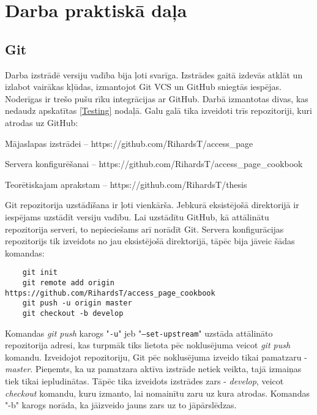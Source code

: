\chapter{Darba praktiskā daļa}

\section{Git}
Darba izstrādē versiju vadība bija ļoti svarīga. Izstrādes gaitā izdevās atklāt un izlabot vairākas kļūdas, izmantojot Git VCS un GitHub sniegtās iespējas. Noderīgas ir trešo pušu rīku integrācijas ar GitHub. Darbā izmantotas divas, kas nedaudz apskatītas \ref{Testing} nodaļā. Galu galā tika izveidoti trīs repozitoriji, kuri atrodas uz GitHub:
\begin{describe}
	\item Mājaslapas izstrādei -- https://github.com/RihardsT/access_page
	\item Servera konfigurēšanai -- https://github.com/RihardsT/access_page_cookbook
	\item Teorētiskajam aprakstam -- https://github.com/RihardsT/thesis
\end{describe}

Git repozitorija uzstādīšana ir ļoti vienkārša. Jebkurā eksistējošā direktorijā ir iespējams uzstādīt versiju vadību. Lai uzstādītu GitHub, kā attālinātu repozitorija serveri, to nepieciešams arī norādīt Git. Servera konfigurācijas repozitorijs tik izveidots no jau eksistējošā direktorijā, tāpēc bija jāveic šādas komandas:
\begin{lstlisting}
	git init
	git remote add origin  https://github.com/RihardsT/access_page_cookbook
	git push -u origin master
	git checkout -b develop
\end{lstlisting}
Komandas \textit{git push} karogs "\texttt{-u}" jeb "\texttt{--set-upstream}" uzstāda attālināto repozitorija adresi, kas turpmāk tiks lietota pēc noklusējuma veicot \textit{git push} komandu. Izveidojot repozitoriju, Git pēc noklusējuma izveido tikai pamatzaru - \textit{master}. Pieņemts, ka uz pamatzara aktīva izstrāde netiek veikta, tajā izmaiņas tiek tikai iepludinātas. Tāpēc tika izveidots izstrādes zars - \textit{develop}, veicot \textit{checkout} komandu, kuru izmanto, lai nomainītu zaru uz kura atrodas. Komandas "-b" karogs norāda, ka jāizveido jauns zars uz to jāpārslēdzas.

